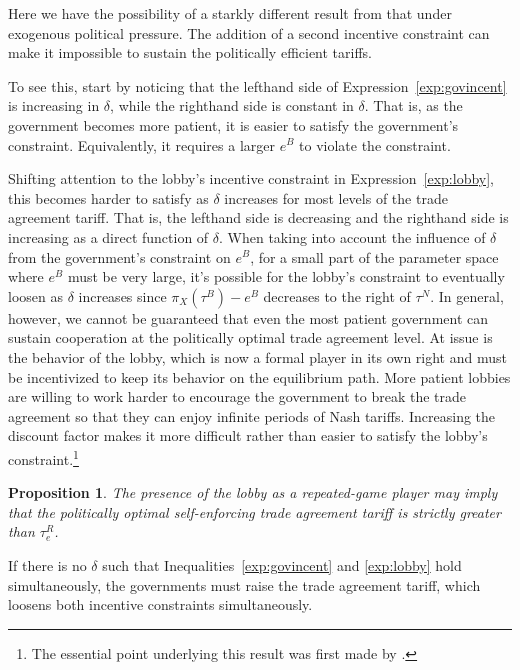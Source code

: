 \documentclass[12pt]{article}
\newtheorem{proposition}{Proposition}
\newcommand{\de}{\delta}
\begin{document}
Here we have the possibility of a starkly different result from that under exogenous political pressure. The addition of a second incentive constraint can make it impossible to sustain the politically efficient tariffs.

To see this, start by noticing that the lefthand side of Expression~\ref{exp:govincent} is increasing in $\de$, while the righthand side is constant in $\de$. That is, as the government becomes more patient, it is easier to satisfy the government's constraint. Equivalently, it requires a larger $e^B$ to violate the constraint.

Shifting attention to the lobby's incentive constraint in Expression~\ref{exp:lobby}, this becomes harder to satisfy as $\de$ increases for most levels of the trade agreement tariff. That is, the lefthand side is decreasing and the righthand side is increasing as a direct function of $\de$. When taking into account the influence of $\de$ from the government's constraint on $e^B$, for a small part of the parameter space where $e^B$ must be very large, it's possible for the lobby's constraint to eventually loosen as $\de$ increases since $\pi_X(\tau^B) - e^B$ decreases to the right of $\tau^N$. In general, however, we cannot be guaranteed that even the most patient government can sustain cooperation at the politically optimal trade agreement level. At issue is the behavior of the lobby, which is now a formal player in its own right and must be incentivized to keep its behavior on the equilibrium path. More patient lobbies are willing to work harder to encourage the government to break the trade agreement so that they can enjoy infinite periods of Nash tariffs. Increasing the discount factor makes it more difficult rather than easier to satisfy the lobby's constraint.\footnote{The essential point underlying this result was first made by \Textcite{buzard2013a}.}

\begin{proposition}
  The presence of the lobby as a repeated-game player may imply that the politically optimal self-enforcing trade agreement tariff is strictly greater than $\tau_e^R$.
	\label{res:repeated}
\end{proposition}

If there is no $\de$ such that Inequalities~\ref{exp:govincent} and \ref{exp:lobby} hold simultaneously, the governments must raise the trade agreement tariff, which loosens both incentive constraints simultaneously.
\end{document}
